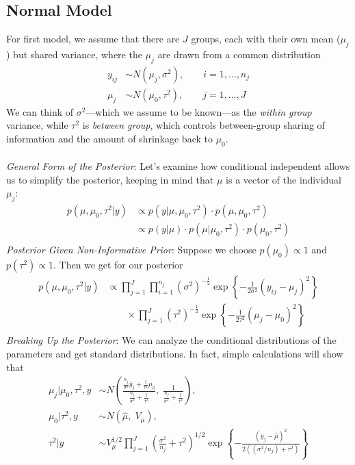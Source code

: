 \documentclass[12pt]{article}
\begin{document}
\newpage
\subsection{Normal Model}

For first model, we assume that there are $J$ groups, each with their
own mean ($\mu_j$) but shared variance, where the $\mu_j$ are drawn
from a common distribution
\begin{align*}
   y_{ij} &\sim N(\mu_j, \sigma^2), \qquad i = 1, \ldots, n_j \\
   \mu_j &\sim N(\mu_0, \tau^2), \qquad j = 1, \ldots, J 
\end{align*}
We can think of $\sigma^2$---which we assume to be known---as the 
\emph{within group} variance, while $\tau^2$ is \emph{between group},
which controls between-group sharing of information
and the amount of shrinkage back to $\mu_0$.
\\
\\
{\sl General Form of the Posterior}: Let's examine how conditional
independent allows us to simplify the posterior, keeping in mind
that $\mu$ is a vector of the individual $\mu_j$:
\begin{align*}
   p(\mu, \mu_0, \tau^2 | y) &\propto p(y | \mu, \mu_0, \tau^2 )\cdot 
      p( \mu, \mu_0, \tau^2 ) \\
   &\propto p(y | \mu ) \cdot p( \mu | \mu_0, \tau^2 ) \cdot
      p( \mu_0, \tau^2 )\\
\end{align*}
{\sl Posterior Given Non-Informative Prior}: Suppose we choose
$p(\mu_0) \propto 1$ and $p(\tau^2) \propto 1$. Then we get for our
posterior 
\begin{align*}
   p(\mu,\mu_0,\tau^2 | y) &\propto \prod^J_{j=1} \prod^{n_j}_{i=1}   
      (\sigma^2)^{-\frac{1}{2}} \exp \left\{ -\frac{1}{2\sigma^2}
      (y_{ij} - \mu_j)^2\right\}  \\ 
      &\qquad \times \prod^J_{j=1} 
      (\tau^2)^{-\frac{1}{2}} \exp\left\{-\frac{1}{2\tau^2}(\mu_j -
      \mu_0)^2\right\} \\
\end{align*}
{\sl Breaking Up the Posterior}: 
We can analyze the conditional distributions of the parameters and
get standard distributions. In fact, simple calculations will show that
\begin{align*}
   \mu_j | \mu_0, \tau^2, y &\sim N\left(\frac{ 
      \frac{n_j}{\sigma^2} \bar{y}_j 
      + \frac{1}{\tau^2}\mu_0}{\frac{n_j}{\sigma^2} + \frac{1}{\tau^2}},
      \; \frac{1}{ \frac{n_j}{\sigma^2} + \frac{1}{\tau^2}} \right), 
      \\
   \mu_0 | \tau^2, y &\sim N\left( \hat{\mu}, 
      \;V_\mu\right),\\
   \tau^2 | y &\sim V^{1/2}_\mu \prod^J_{j=1} \left( 
   \frac{\sigma^2}{n_j} + \tau^2\right)^{1/2} 
   \exp \left\{ -\frac{(\bar{y}_j 
   -\hat{\mu})^2}{2 \left( (\sigma^2/n_j) + \tau^2\right)}
   \right\}
\end{align*}
\end{document}
